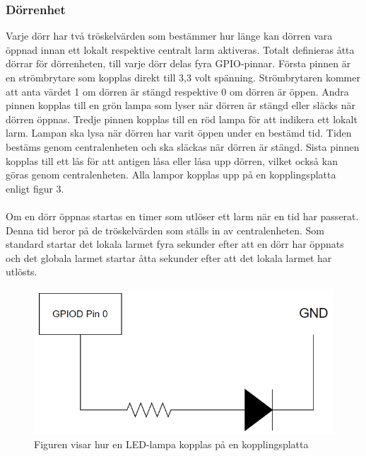 \documentclass{article}
\begin{document}
\subsubsection{Dörrenhet}
Varje dörr har två tröskelvärden som bestämmer hur länge kan dörren vara öppnad innan ett lokalt respektive centralt larm aktiveras. 
Totalt definieras åtta dörrar för dörrenheten, till varje dörr delas fyra GPIO-pinnar. Första pinnen är en strömbrytare som kopplas direkt till 3,3 volt spänning. 
Strömbrytaren kommer att anta värdet 1 om dörren är stängd respektive 0 om dörren är öppen. 
Andra pinnen kopplas till en grön lampa som lyser när dörren är stängd eller släcks när dörren öppnas. 
Tredje pinnen kopplas till en röd lampa för att indikera ett lokalt larm. 
Lampan ska lysa när dörren har varit öppen under en bestämd tid. 
Tiden bestäms genom centralenheten och ska släckas när dörren är stängd. 
Sista pinnen kopplas till ett lås för att antigen låsa eller låsa upp dörren, vilket också kan göras genom centralenheten. 
Alla lampor kopplas upp på en kopplingsplatta enligt figur 3.\\
\\
Om en dörr öppnas startas en timer som utlöser ett larm när en tid har passerat. 
Denna tid beror på de tröskelvärden som ställs in av centralenheten. 
Som standard startar det lokala larmet fyra sekunder efter att en dörr har öppnats och det globala larmet startar åtta sekunder efter att det lokala larmet har utlösts. 

\begin{figure}[h]
    \centering
    \includegraphics[scale=0.5]{Projektrapport/LED.png}
    \caption {Figuren visar hur en LED-lampa kopplas på en kopplingsplatta}
    \label{fig:drawing}
\end{figure}
\end{document}
